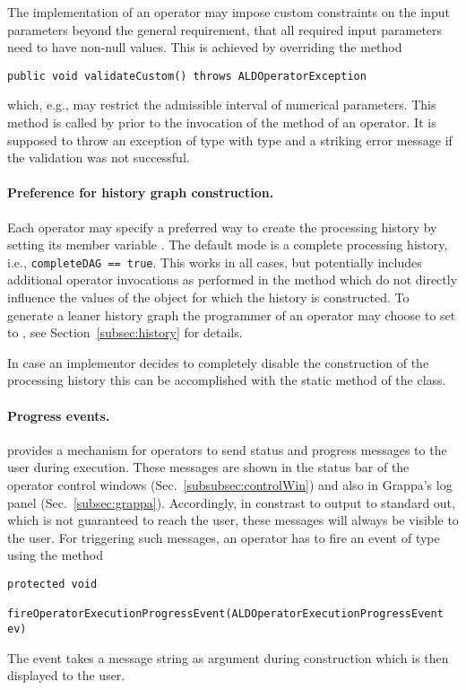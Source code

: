 The implementation of an operator may impose 
custom constraints on the input parameters
beyond the general requirement, that all required input parameters
need to have non-null values.
This is achieved by overriding the method \\
\begin{lstlisting}[xrightmargin=.00\textwidth, xleftmargin=.0\textwidth,frame=single,numbers=none]
  public void validateCustom() throws ALDOperatorException
\end{lstlisting}
which, e.g., may restrict the admissible interval of numerical parameters.
This method is called by  prior to the invocation of the
 method of an operator. It is supposed to throw an exception
of type  with type  and
a striking error message if the validation was not successful.

\paragraph{Preference for history graph construction.}
Each operator may specify a preferred
way to create the processing history by setting
its member variable .
The default mode is a complete processing history,
i.e., \texttt{completeDAG == true}. This works in all cases,
but potentially includes additional operator invocations as performed in the
 method which do not directly influence
the values of the object for which the history is constructed.
To generate a leaner history graph the programmer of an operator
may choose to set  to , see
Section~\ref{subsec:history} for details.

In case an implementor decides to completely disable the construction of the processing history 
this can be accomplished with the static method  of
the  class.


\paragraph{Progress events.} \alida provides a mechanism for operators
to send status and progress messages to the user during execution. These messages
are shown in the status bar of the operator control windows
(Sec.~\ref{subsubsec:controlWin}) and also in Grappa's log panel
(Sec.~\ref{subsec:grappa}). Accordingly, in constrast to output to standard out,
which is not guaranteed to reach the user, these messages will always be visible
to the user. For triggering such messages, an operator has to fire an event of
type  using the method\\
\begin{lstlisting}[xrightmargin=.00\textwidth, xleftmargin=.0\textwidth,frame=single,numbers=none]
  protected void
	  fireOperatorExecutionProgressEvent(ALDOperatorExecutionProgressEvent ev)
\end{lstlisting}
The event takes a message string as argument during construction which is then
displayed to the user.

